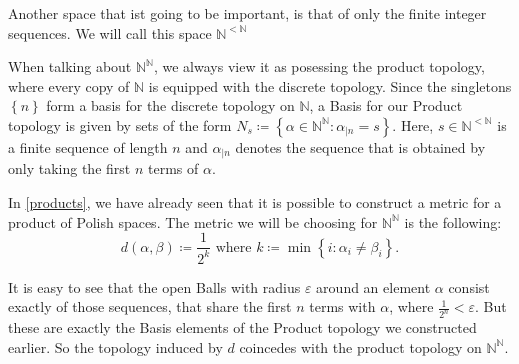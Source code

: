 \documentclass[10pt, a4paper, titlepage]{article}
\numberwithin{equation}{section}
\begin{document}
Another space that ist going to be important, is that of only the finite integer
sequences. 
We will call this space $\mathbb{N}^{<\mathbb{N}}$

When talking about $\mathbb{N}^\mathbb{N}$, we always view it as posessing the
product topology, where every copy of $\mathbb{N}$ is equipped with the discrete
topology. 
Since the singletons $\left\{ n \right\} $ form a basis for the discrete
topology on $\mathbb{N}$, a Basis for our Product topology is given by sets of
the form $N_s \coloneq \left\{\alpha \in \mathbb{N}^\mathbb{N} : \alpha_{|n} =
s \right\}$. 
Here, $s \in \mathbb{N}^{<\mathbb{N}}$ is a finite sequence of
length $n$ and
$\alpha_{|n}$ denotes the sequence that is obtained by only taking the first $n$
terms of  $\alpha$.

In \autoref{products}, we have already seen that it is possible to construct a metric for a
product of Polish spaces.
The metric we will be choosing for $\mathbb{N}^\mathbb{N}$ is the following:
\[
	d\left( \alpha,\beta \right) \coloneq \frac{1}{2^k} \text{ where }
	k\coloneq \min\left\{i: \alpha_i \neq \beta_i\right\}
.\] 

It is easy to see that the open Balls with radius $\varepsilon$ around an
element $\alpha$ consist exactly of those sequences, that share the first $n$
terms with $\alpha$, where  $\frac{1}{2^n} < \varepsilon$. 
But these are exactly the Basis elements of the Product topology we constructed
earlier. 
So the topology induced by $d$ coincedes with the product topology on
$\mathbb{N}^\mathbb{N}$.
\end{document}
